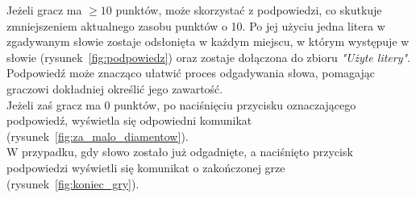 \documentclass[]{report}
\begin{document}
Jeżeli gracz ma $\geq10$ punktów, może skorzystać z podpowiedzi, co skutkuje zmniejszeniem aktualnego zasobu punktów o 10. Po jej użyciu jedna litera w zgadywanym słowie zostaje odsłonięta w każdym miejscu, w którym występuje w słowie (rysunek~\ref{fig:podpowiedz}) oraz zostaje dołączona do zbioru \textit{"Użyte litery"}. Podpowiedź może znacząco ułatwić proces odgadywania słowa, pomagając graczowi dokładniej określić jego zawartość. 
\vspace{0.25cm}
\\Jeżeli zaś gracz ma $0$ punktów, po naciśnięciu przycisku oznaczającego podpowiedź, wyświetla się odpowiedni komunikat (rysunek~\ref{fig:za_malo_diamentow}).
\vspace{0.25cm}
\\W przypadku, gdy słowo zostało już odgadnięte, a naciśnięto przycisk podpowiedzi wyświetli się komunikat o zakończonej grze (rysunek~\ref{fig:koniec_gry}).

\vspace{0.5cm}
\end{document}
